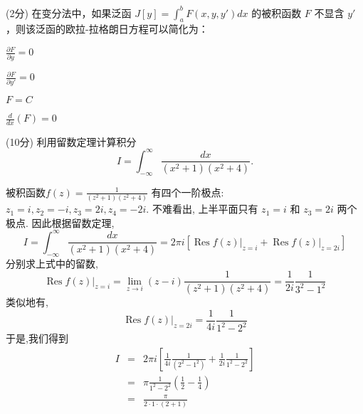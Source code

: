 \documentclass{njustexam}
\begin{document}
                    \begin{problem}{(2分)}
                    在变分法中，如果泛函 $J[y] = \int_{a}^{b} F(x, y, y') dx$ 的被积函数 $F$ 不显含 $y'$，则该泛函的欧拉-拉格朗日方程可以简化为：
                    \begin{abcd}
                    \item $\frac{\partial F}{\partial y} = 0$
                    \item $\frac{\partial F}{\partial y'} = 0$
                    \item $F = C$
                    \item $\frac{d}{dx} \left( F \right) = 0$
                    \end{abcd}
                    \end{problem}


\begin{problem}{(10分)}
    利用留数定理计算积分 
    $$I = \int_{-\infty}^{\infty} \frac{d x}{(x^2 + 1)(x^2+4)}. $$
    \end{problem}
    \vspace{1em}
    \begin{solution}
    被积函数$f(z) =\frac{1}{(z^2+1)(z^2+4)}$ 有四个一阶极点: 
    $z_1=i, z_2=-i, z_3=2i, z_4=-2i$. 
    不难看出, 上半平面只有 $z_1=i$ 和 $z_3=2i$ 两个极点. 
    因此根据留数定理,
    $$
    I=\int_{-\infty}^{\infty} \frac{d x}{(x^2+1)(x^2+4)}=
    2 \pi i\left[\left.\operatorname{Res} f(z)\right|_{z=i}+\left.\operatorname{Res} f(z)\right|_{z=2i}\right]
    $$
    分别求上式中的留数, 
    $$ 
    \left.\operatorname{Res} f(z)\right|_{z=i}=\lim _{z \rightarrow i}(z-i) \frac{1}{(z^2+1)(z^2+4)}=\frac{1}{2 i} \frac{1}{3^2-1^2} 
    $$ 
    类似地有,
    $$\left.\operatorname{Res} f(z)\right|_{z=2i}=\frac{1}{4 i} \frac{1}{1^2-2^2}$$ 
    于是,我们得到
    \begin{eqnarray*}
      I &=&2 \pi i\left[\frac{1}{4 i} \frac{1}{(2^2-1^2)}+\frac{1}{2 i} \frac{1}{1^2-2^2}\right]   \\
      &=&\pi \frac{1}{1^2-2^2}\left(\frac{1}{2}-\frac{1}{4}\right) \\
      &=&\frac{\pi}{2 \cdot 1 \cdot (2+1)}  \text{ }
    \end{eqnarray*} 
    \end{solution}
    
\end{document}
